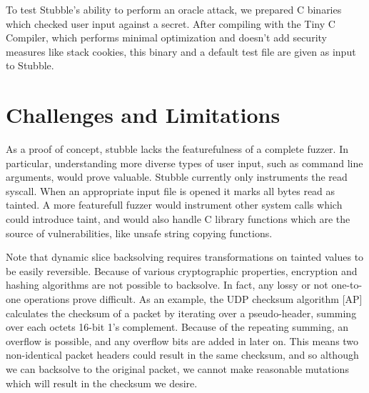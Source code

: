 \documentclass[11pt,expanded,copyright]{fsuthesis}
\begin{document}
To test Stubble's ability to perform an oracle attack, we prepared C binaries which checked user input against a secret. After compiling with the Tiny C Compiler, which performs minimal optimization and doesn't add security measures like stack cookies, this binary and a default test file are given as input to Stubble.

\section{Challenges and Limitations}

As a proof of concept, stubble lacks the featurefulness of a complete fuzzer. In particular, understanding more diverse types of user input, such as command line arguments, would prove valuable. Stubble currently only instruments the read syscall. When an appropriate input file is opened it marks all bytes read as tainted. A more featurefull fuzzer would instrument other system calls which could introduce taint, and would also handle C library functions which are the source of vulnerabilities, like unsafe string copying functions.

Note that dynamic slice backsolving requires transformations on tainted values to be easily reversible. Because of various cryptographic properties, encryption and hashing algorithms are not possible to backsolve. In fact, any lossy or not one-to-one operations prove difficult. As an example, the UDP checksum algorithm [AP] calculates the checksum of a packet by iterating over a pseudo-header, summing over each octets 16-bit 1's complement. Because of the repeating summing, an overflow is possible, and any overflow bits are added in later on. This means two non-identical packet headers could result in the same checksum, and so although we can backsolve to the original packet, we cannot make reasonable mutations which will result in the checksum we desire.



\end{document}
